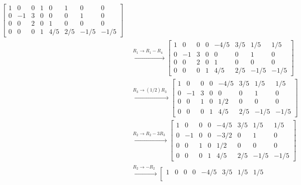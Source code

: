 \documentclass{article}
\begin{document}
\begin{itemize}
\begin{align*}
\left[\begin{array}{cccc|cccc}
1 & 0 & 0 & 1 &    0 &     1 &    0 & 0 \\
0 & -1 & 3 & 0 &   0 &    0 &     1 & 0 \\
0 & 0 & 2 & 0 &    1 &     0 &     0 & 0 \\
0 & 0 & 0 & 1 & 4/5 & 2/5 & -1/5 & -1/5
\end{array}\right] \\ 
& \xrightarrow{\begin{array}{c} R_1 \rightarrow R_1 - R_4 \end{array}}
\left[\begin{array}{cccc|cccc}
1 & 0 & 0 & 0 & -4/5 & 3/5 & 1/5 &  1/5 \\
0 & -1 & 3 & 0 &    0 &    0 &     1 &     0 \\
0 & 0 & 2 & 0 &     1 &     0 &     0 &    0 \\
0 & 0 & 0 & 1 & 4/5 & 2/5 & -1/5 & -1/5
\end{array}\right] \\ 
& \xrightarrow{\begin{array}{c} R_3 \rightarrow (1/2)R_3 \end{array}}
\left[\begin{array}{cccc|cccc}
1 & 0 & 0 & 0 & -4/5 & 3/5 & 1/5 &  1/5 \\
0 & -1 & 3 & 0 &    0 &    0 &     1 &     0 \\
0 & 0 & 1 & 0 & 1/2 &     0 &     0 &    0 \\
0 & 0 & 0 & 1 & 4/5 & 2/5 & -1/5 & -1/5
\end{array}\right] \\ 
& \xrightarrow{\begin{array}{c} R_2 \rightarrow R_2 - 3R_3 \end{array}}
\left[\begin{array}{cccc|cccc}
1 & 0 & 0 & 0  & -4/5 & 3/5 & 1/5 &  1/5 \\
0 & -1 & 0 & 0 & -3/2 &    0 &     1 &     0 \\
0 & 0 & 1 & 0  & 1/2 &     0 &     0 &    0 \\
0 & 0 & 0 & 1  & 4/5 & 2/5 & -1/5 & -1/5
\end{array}\right] \\ 
& \xrightarrow{\begin{array}{c} R_2 \rightarrow -R_2 \end{array}}
\left[\begin{array}{cccc|cccc}
1 & 0 & 0 & 0  & -4/5 & 3/5 & 1/5 &  1/5 \\

\end{array}
\end{align*}
\end{itemize}
\end{document}
